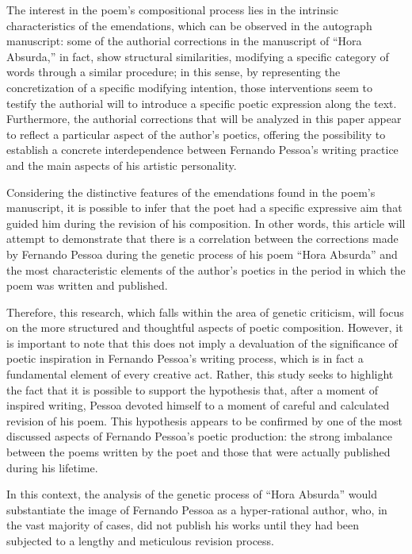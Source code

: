 \begin{paper}
The interest in the poem's compositional process lies in the intrinsic
characteristics of the emendations, which can be observed in the
autograph manuscript: some of the authorial corrections in the
manuscript of ``Hora Absurda,'' in fact, show structural similarities,
modifying a specific category of words through a similar procedure; in
this sense, by representing the concretization of a specific modifying
intention, those interventions seem to testify the authorial will to
introduce a specific poetic expression along the text. Furthermore, the
authorial corrections that will be analyzed in this paper appear to reflect a
particular aspect of the author's poetics, offering the possibility to
establish a concrete interdependence between Fernando Pessoa's writing
practice and the main aspects of his artistic personality.

Considering the distinctive features of the emendations found in the
poem's manuscript, it is possible to infer that the poet had a specific
expressive aim that guided him during the revision of his composition.
In other words, this article will attempt to demonstrate that there is a
correlation between the corrections made by Fernando Pessoa during the
genetic process of his poem ``Hora Absurda'' and the most characteristic
elements of the author's poetics in the period in which the poem was
written and published.

Therefore, this research, which falls within the area of genetic
criticism, will focus on the more structured and thoughtful aspects of
poetic composition. However, it is important to note that this does not
imply a devaluation of the significance of poetic inspiration in Fernando
Pessoa's writing process, which is in fact a fundamental element of
every creative act. Rather, this study seeks to highlight the fact that
it is possible to support the hypothesis that, after a moment of
inspired writing, Pessoa devoted himself to a moment of careful and
calculated revision of his poem. This hypothesis appears to be confirmed
by one of the most discussed aspects of Fernando Pessoa's poetic
production: the strong imbalance between the poems written by the poet
and those that were actually published during his lifetime.

In this context, the analysis of the genetic process of ``Hora Absurda''
would substantiate the image of Fernando Pessoa as a hyper-rational
author, who, in the vast majority of cases, did not publish his works
until they had been subjected to a lengthy and meticulous revision
process.


\end{paper}
